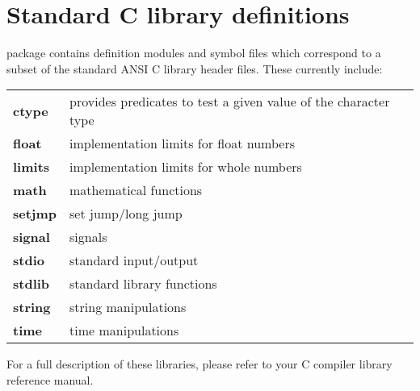 \chapter{Standard C library definitions}\label{lib:clib}

\xds{} package contains definition modules and symbol files which
correspond to a subset of the standard ANSI C library header files.
These currently include:
\begin{flushleft}
\begin{tabular}{ll}
\bf ctype     &  provides predicates to test a given value
                 of the character type                           \\
\bf float     &  implementation limits for float numbers \\
\bf limits    &  implementation limits for whole numbers \\
\bf math      &  mathematical functions \\
\bf setjmp    &  set jump/long jump \\
\bf signal    &  signals \\
\bf stdio     &  standard input/output \\
\bf stdlib    &  standard library functions \\
\bf string    &  string manipulations \\
\bf time      &  time manipulations \\
\end{tabular}
\end{flushleft}

\noindent
For a full description of these libraries, please refer to your C
compiler library reference manual.
